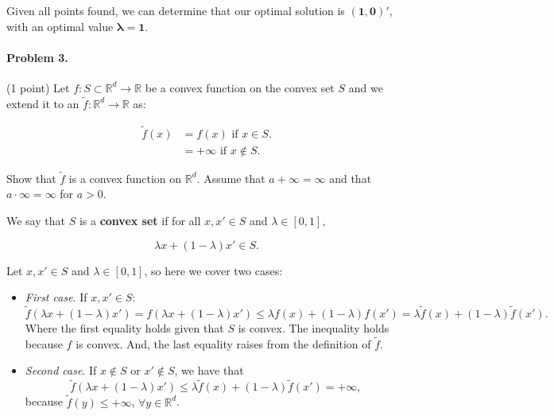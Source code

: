 \documentclass[12pt]{scrartcl}
\begin{document}
Given all points found, we can determine that our optimal solution is $\mathbf{(1, 0)'}$, with an optimal value $\mathbf{\lambda=1}$.

\vspace{1em}






\begin{boxF}
\paragraph*{Problem 3.} (1 point) \hspace{0.15em} Let $f : S \subset \mathbb{R}^d \to \mathbb{R}$ be a convex function on the convex set $S$ and we extend it to an $\tilde f : \mathbb{R}^d \to \mathbb{R}$ as:

    \begin{align*}
        \tilde f(x) &= f(x) \mbox{ if } x \in S. \\
                    &= +\infty \mbox{ if } x \notin S.
    \end{align*}

Show that $\tilde f$ is a convex function on $\mathbb{R}^d$. Assume that $a + \infty = \infty $ and that $ a \cdot \infty = \infty$ for $a > 0$.
\end{boxF}

We say that $S$ is a \textbf{convex set} if for all $x, x' \in S$ and $\lambda \in [0,1]$,

\begin{equation*}
    \lambda x + (1 - \lambda) x' \in S.
\end{equation*}

Let $x, x' \in S$ and $\lambda \in [0,1]$, so here we cover two cases:

\begin{itemize}
    \item \textit{First case}. If $x, x' \in S$:
    \begin{equation*}
        \tilde f (\lambda x + (1- \lambda)x') = f (\lambda x + (1- \lambda)x')  \leq \lambda f(x) + (1-\lambda)f(x') = \lambda \tilde f(x) + (1-\lambda)\tilde f(x').
    \end{equation*}
    Where the first equality holds given that $S$ is convex. The inequality holds because $f$ is convex. And, the last equality raises from the definition of $\tilde f$.

    \item \textit{Second case}. If $x \notin S$ or $x' \notin S$, we have that
    \begin{equation*}
        \tilde f (\lambda x + (1- \lambda)x') \leq \lambda \tilde f (x) + (1 - \lambda) \tilde f (x') = + \infty,
    \end{equation*}
    because $\tilde f (y) \leq + \infty$, $\forall y \in \mathbb{R}^d$.
\end{itemize}
\end{document}
